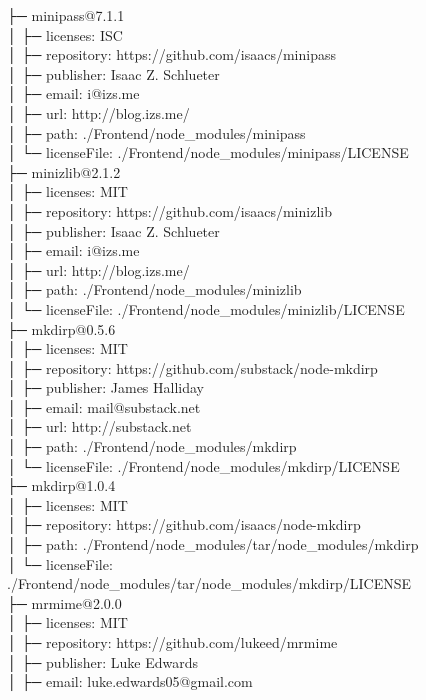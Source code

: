 ├─ minipass@7.1.1\\
│  ├─ licenses: ISC\\
│  ├─ repository: https://github.com/isaacs/minipass\\
│  ├─ publisher: Isaac Z. Schlueter\\
│  ├─ email: i@izs.me\\
│  ├─ url: http://blog.izs.me/\\
│  ├─ path: ./Frontend/node\_modules/minipass\\
│  └─ licenseFile: ./Frontend/node\_modules/minipass/LICENSE\\
├─ minizlib@2.1.2\\
│  ├─ licenses: MIT\\
│  ├─ repository: https://github.com/isaacs/minizlib\\
│  ├─ publisher: Isaac Z. Schlueter\\
│  ├─ email: i@izs.me\\
│  ├─ url: http://blog.izs.me/\\
│  ├─ path: ./Frontend/node\_modules/minizlib\\
│  └─ licenseFile: ./Frontend/node\_modules/minizlib/LICENSE\\
├─ mkdirp@0.5.6\\
│  ├─ licenses: MIT\\
│  ├─ repository: https://github.com/substack/node-mkdirp\\
│  ├─ publisher: James Halliday\\
│  ├─ email: mail@substack.net\\
│  ├─ url: http://substack.net\\
│  ├─ path: ./Frontend/node\_modules/mkdirp\\
│  └─ licenseFile: ./Frontend/node\_modules/mkdirp/LICENSE\\
├─ mkdirp@1.0.4\\
│  ├─ licenses: MIT\\
│  ├─ repository: https://github.com/isaacs/node-mkdirp\\
│  ├─ path: ./Frontend/node\_modules/tar/node\_modules/mkdirp\\
│  └─ licenseFile: ./Frontend/node\_modules/tar/node\_modules/mkdirp/LICENSE\\
├─ mrmime@2.0.0\\
│  ├─ licenses: MIT\\
│  ├─ repository: https://github.com/lukeed/mrmime\\
│  ├─ publisher: Luke Edwards\\
│  ├─ email: luke.edwards05@gmail.com\\
